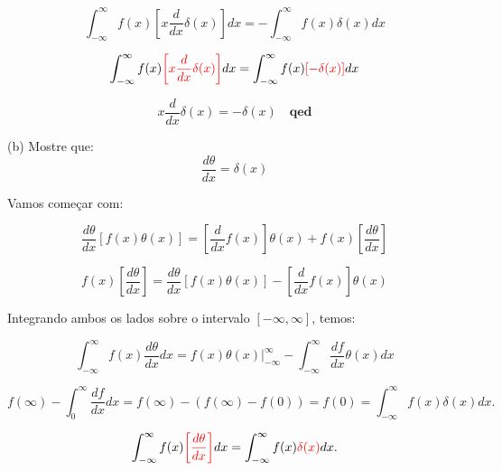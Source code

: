 \documentclass[a4paper,12pt]{article}
\begin{document}
\begin{equation}
    \int_{-\infty}^{\infty} f(x)\left[x \frac{d}{d x} \delta(x)\right] d x = -\int_{-\infty}^{\infty} f(x) \delta(x) d x
\end{equation}

\begin{equation}
    \int_{-\infty}^{\infty} f(x) \textcolor{red}{\left[x \frac{d}{d x} \delta(x)\right]} d x = \int_{-\infty}^{\infty} f(x)\textcolor{red}{\left[- \delta(x)\right]} d x
\end{equation}

\begin{equation}
    \boxed{
    x \frac{d}{d x} \delta(x)=-\delta(x) \quad \mathbf{qed}
    }
\end{equation}


(b) Mostre que:
\begin{equation}
    \frac{d\theta}{d x} = \delta(x)
\end{equation}

Vamos come\c{c}ar com:

\begin{equation}
\frac{d \theta}{d x}\left[ f(x)\theta(x)\right] = \left[ \frac{d}{dx}f(x)\right]\theta(x) + f(x)\left[ \frac{d \theta}{d x}\right]
\end{equation}

\begin{equation}
    f(x)\left[ \frac{d \theta}{d x}\right] = \frac{d \theta}{d x}\left[ f(x)\theta(x)\right] - \left[ \frac{d}{dx}f(x)\right]\theta(x)
\end{equation}

Integrando ambos os lados sobre o intervalo $[-\infty,\infty]$, temos:

\begin{equation}
    \int_{-\infty}^{\infty} f(x) \frac{d \theta}{d x} d x=\left.f(x) \theta(x)\right|_{-\infty} ^{\infty}-\int_{-\infty}^{\infty} \frac{d f}{d x} \theta(x) d x
\end{equation}


\begin{equation}
    f(\infty)-\int_{0}^{\infty} \frac{d f}{d x} d x=f(\infty)-(f(\infty)-f(0))=f(0)=\int_{-\infty}^{\infty} f(x) \delta(x) d x.
\end{equation}


\begin{equation}
    \int_{-\infty}^{\infty} f(x) \textcolor{red}{\left[\frac{d \theta}{d x}\right]}d x= \int_{-\infty}^{\infty} f(x) \textcolor{red}{\delta(x)} d x.
\end{equation}
\end{document}
